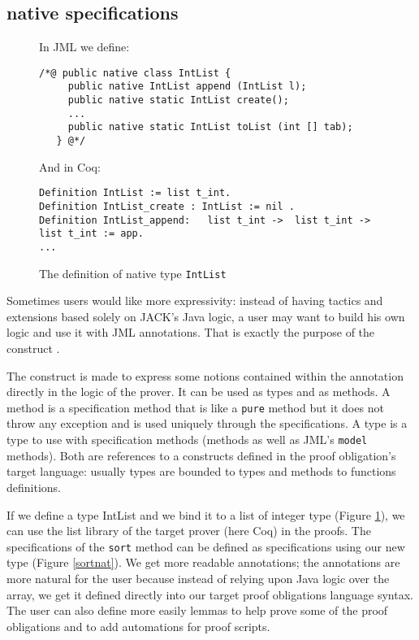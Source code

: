 \subsection{native specifications}
\begin{figure}[t!]
{\small In JML we define:
\begin{verbatim}
/*@ public native class IntList {
     public native IntList append (IntList l);
     public native static IntList create();
     ...
     public native static IntList toList (int [] tab);
   } @*/ \end{verbatim}}

{\small And in Coq:
\begin{verbatim}
Definition IntList := list t_int.
Definition IntList_create : IntList := nil .  
Definition IntList_append:   list t_int ->  list t_int -> list t_int := app.
... \end{verbatim}}
\caption{The definition of native type \texttt{IntList}}\label{CoqAnnot} 
\end{figure}
Sometimes users would like more expressivity: instead of having
tactics and extensions based solely on JACK's Java logic, a user may want to
build his own logic and use it with JML annotations. That is 
exactly the purpose of the \native construct \cite{Charles06}.

The \native construct is made to express some notions contained within
the annotation directly in the logic of the prover. It can be used 
as \native types and as  \native methods.
A \native method is a specification method that is like a {\tt pure} method 
but  it does not throw any exception and is used uniquely through the specifications. 
A \native type is a type to use with specification methods (\native methods as well as 
JML's {\tt model} methods). Both are references to a constructs 
defined in the proof obligation's target language: usually \native types are bounded to 
types and \native methods to functions definitions.


If we define a \native type IntList and we bind it to a list of integer type 
 (Figure \ref{CoqAnnot}), we can use the list library of the target prover (here Coq) 
in the proofs. The specifications of the
{\tt sort} method can be defined as specifications using our new type 
(Figure \ref{sortnat}). We get more readable annotations;
the annotations are more natural for the user because instead
 of relying upon Java logic over the array, we get it defined directly into
our target proof obligations language syntax.
The user can also define more easily lemmas to help prove some of the proof
obligations and to add automations for proof scripts.


